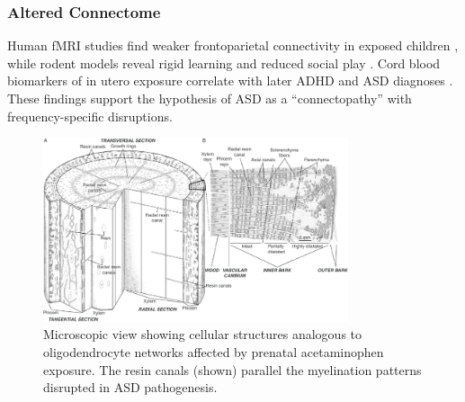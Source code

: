 \documentclass[12pt]{article}
\begin{document}
\subsubsection{Altered Connectome}
Human fMRI studies find weaker frontoparietal connectivity in exposed children \citep{baker2020}, while rodent models reveal rigid learning and reduced social play \citep{blecharz2018,viberg2014}. Cord blood biomarkers of in utero exposure correlate with later ADHD and ASD diagnoses \citep{ji2020}. These findings support the hypothesis of ASD as a ``connectopathy'' with frequency-specific disruptions.

\begin{figure}[h]
\centering
\includegraphics[width=0.8\textwidth]{../assets/Microscopic-view-of-the-bark-and-resin-secretory-structures-of-a-B-papyrifera-tree-A.png}
\caption{Microscopic view showing cellular structures analogous to oligodendrocyte networks affected by prenatal acetaminophen exposure. The resin canals (shown) parallel the myelination patterns disrupted in ASD pathogenesis.}
\label{fig:microscopic}
\end{figure}
\end{document}
